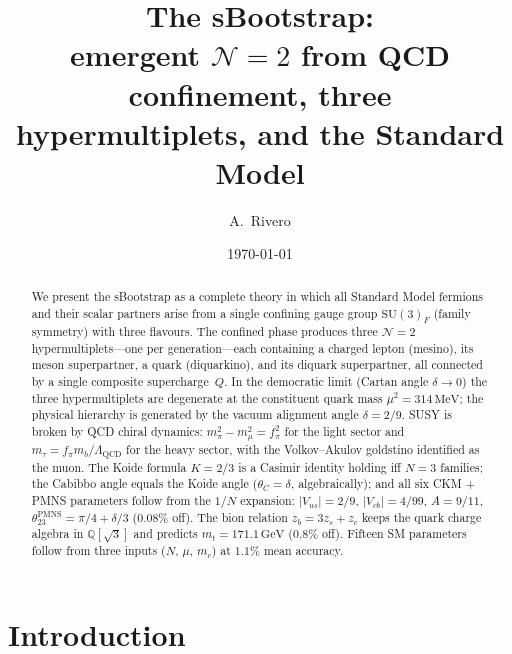 \documentclass[aps,prd,twocolumn,showpacs,preprintnumbers,superscriptaddress]{revtex4-2}
\newcommand{\SU}{\mathrm{SU}}
\newcommand{\MeV}{\,\mathrm{MeV}}
\newcommand{\GeV}{\,\mathrm{GeV}}
\newcommand{\Lqcd}{\Lambda_{\mathrm{QCD}}}
\begin{document}
\title{The sBootstrap:\\
  emergent $\mathcal{N}{=}2$ from QCD confinement, three
  hypermultiplets, and the Standard Model}

\author{A.\ Rivero}

\date{\today}

\begin{abstract}
We present the sBootstrap as a complete theory in which all
Standard Model fermions and their scalar partners arise from
a single confining gauge group $\SU(3)_F$ (family symmetry)
with three flavours.
The confined phase produces three $\mathcal{N}{=}2$
hypermultiplets---one per generation---each containing a
charged lepton (mesino), its meson superpartner, a quark
(diquarkino), and its diquark superpartner, all connected
by a single composite supercharge~$Q$.
In the democratic limit (Cartan angle $\delta \to 0$) the
three hypermultiplets are degenerate at the constituent quark
mass $\mu^2 = 314\MeV$; the physical hierarchy is generated
by the vacuum alignment angle $\delta = 2/9$.
SUSY is broken by QCD chiral dynamics: $m_\pi^2 - m_\mu^2 =
f_\pi^2$ for the light sector and $m_\tau = f_\pi m_b/\Lqcd$
for the heavy sector, with the Volkov--Akulov goldstino
identified as the muon.
The Koide formula $K = 2/3$ is a Casimir identity holding iff
$N = 3$ families; the Cabibbo angle equals the Koide angle
($\theta_C = \delta$, algebraically); and all six CKM + PMNS
parameters follow from the $1/N$ expansion:
$|V_{us}| = 2/9$, $|V_{cb}| = 4/99$, $A = 9/11$,
$\theta_{23}^{\mathrm{PMNS}} = \pi/4 + \delta/3$
($0.08\%$ off).
The bion relation $z_b = 3z_s + z_c$ keeps the quark
charge algebra in $\mathbb{Q}[\sqrt{3}]$ and predicts
$m_t = 171.1\GeV$ ($0.8\%$ off).
Fifteen SM parameters follow from three inputs
($N$, $\mu$, $m_c$) at $1.1\%$ mean accuracy.
\end{abstract}

\maketitle

\section{Introduction}
\label{sec:intro}
\end{document}
